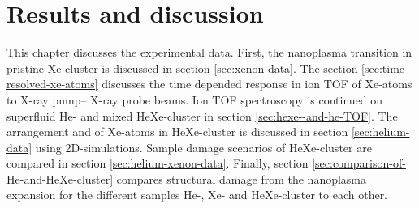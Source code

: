 \chapter{Results and discussion}\label{ch:results}
This chapter discusses the experimental data. First, the nanoplasma transition in pristine Xe-cluster is discussed in section \ref{sec:xenon-data}. The section \ref{sec:time-resolved-xe-atoms} discusses the time depended response in ion TOF of Xe-atoms to X-ray pump-- X-ray probe beams. Ion TOF spectroscopy is continued on superfluid He- and mixed HeXe-cluster in section \ref{sec:hexe--and-he-TOF}. The arrangement and of Xe-atoms in HeXe-cluster is discussed in section \ref{sec:helium-data} using 2D-simulations. Sample damage scenarios of HeXe-cluster are compared in section \ref{sec:helium-xenon-data}. Finally, section \ref{sec:comparison-of-He-and-HeXe-cluster} compares structural damage from the nanoplasma expansion for the different samples He-, Xe- and HeXe-cluster to each other.
%
%
%
